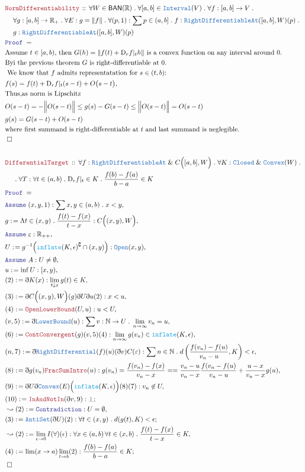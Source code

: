 \documentclass[12pt]{scrartcl}
\newcommand{\TYPE}[1]{\textcolor{NavyBlue}{\mathtt{#1}}}
\newcommand{\FUNC}[1]{\textcolor{Cerulean}{\mathtt{#1}}}
\newcommand{\LOGIC}[1]{\textcolor{Blue}{\mathtt{#1}}}
\newcommand{\THM}[1]{\textcolor{Maroon}{\mathtt{#1}}}
\renewcommand{\.}{\; . \;}
\newcommand{\de}{: \kern 0.1pc =}
\newcommand{\Theorem}[2]{& \THM{#1} \, :: \, #2 \\ & \Proof = \\ }
\newcommand{\NewLine}{\\ & \kern 1pc}
\newcommand{\Page}[1]{\begin{align*} #1 \end{align*}   }
\newcommand{ \bd }{ \ByDef }
\renewcommand{\And}{\; \& \;}
\newcommand{\Reals}{\mathbb{R} }
\newcommand{\Nat}{\mathbb{N} }
\renewcommand{\c}{\complement}
\newcommand{\Say}[3]{& #1 \de #2 : #3, \\}
\newcommand{\Conclude}[3]{& #1 \de #2 : #3; \\}
\newcommand{\Derive}[3]{& \leadsto #1 \de #2 : #3, \\}
\newcommand{\A}{\LOGIC{Assume} \;}
\newcommand{\Assume}[2]{& \A #1 : #2, \\}
\newcommand{\QED}{\; \square}
\newcommand{\EndProof}{& \QED \\}
\newcommand{\ByDef}{\eth}
\newcommand{\Proof}{\LOGIC{Proof} \; }
\newcommand{\BAN}{\mathsf{BAN}} %
\newcommand{\D}{\mathrm{D}}
\begin{document}
\Page{
	\Theorem{NormDifferentiability}{
		\forall W \in \BAN(\Reals) \. \forall [a,b] \in \TYPE{Interval}(V)  \.
		\forall f : [a,b] \to V \. \NewLine
		\forall g : [a,b] \to \Reals_{+} \. 
		\forall E : g = \| f \|  \.
		\forall (p,1) : \sum p \in  (a,b] \. f : \TYPE{RightDifferentiableAt}([a,b],W)(p) \.
		\NewLine
		g : \TYPE{RightDifferentiableAt}([a,b],W)(p)
	}
	& \textrm{Assume $t \in  [a,b)$, then $G(h) = \| f(t) + \D_r f |_t h \|$ is a convex function on any interval around $0$.} \\
	& \textrm{Byi the previous theorem $G$ is right-differentiable at $0$.  } \\
        & \textrm{ We know that $f$ admits representatation for $s \in (t,b)$:}\\
	& f(s) = f(t) + \D_r f |_t(s - t) + O\big( s -t \big), \\
	& \textrm{Thus,as norm is Lipschitz} \\
	&  O(s - t)  = - \Big\| O(s-t) \Big\| \le  g(s) - G(s - t)  \le \Big\| O(s - t) \Big\| = O(s - t)  \\
	&    g(s)  = G(s - t) + O(s - t)  \\
	& \textrm{where first summand is right-differentiable at $t$ and last summand is neglegible.}   \\
	\EndProof
	\\
	\Theorem{DifferentialTarget}{ \forall f : \TYPE{RightDifferentiableAt} \And C  \Big([a,b],W \Big) \.
	       \forall K : \TYPE{Closed} \And \TYPE{Convex}(W) \. 
	       \NewLine \.
	       \forall T : \forall t \in (a,b) \. \D_r f |_t \in K \.
	       \frac{ f(b) - f(a) }{b - a} \in K
	}
	\Assume{(x,y,1)}
	{
	  \sum x,y \in  (a,b) \.  x < y	
	}
	\Say{g}{\Lambda t \in (x,y) \. \frac{f(t) - f(x)}{t - x}}{C \Big( (x,y),W \Big)}
	\Assume{\varepsilon}{\Reals_{++}} 
	\Say{U}{ g^{-1} \Big(  \FUNC{inflate}( K, \epsilon   )^\c \cap (x,y)  \Big) }{\TYPE{Open}(x,y)}
	\Assume{A}{U \neq \emptyset}
	\Say{u}{ \inf U }{ [x,y) }
	\Say{(2)}{ \bd K(x)}{ \lim_{t \downarrow x} g(t) \in K }
	\Say{(3)}{\bd C\Big((x,y),W\Big )(g) \bd U \bd u(2) }{ x < u }
	\Say{(4)}{ \THM{OpenLowerBound}(U,u) }{u < U}
	\Say{(v,5)}{\bd \TYPE{LowerBound}(u)}{\sum v : \Nat \to U \. \lim_{n \to \infty} v_n = u}
	\Say{(6)}{\THM{ContConvergent}(g)(v,5)(4)}{\lim_{ n \to \infty} g(v_n) \in \FUNC{inflate}(K,\epsilon)}
	\Say{(n,7)}{ \bd \TYPE{RightDifferential}(f)(u)(\bd v)C(\varepsilon)}{ \sum n \in \Nat \. d\left(\frac{f(v_n) - f(u)}{v_n - u},K \right) < \epsilon    }
	\Say{(8)}{\bd g(v_n) \THM{FracSumIntro}(u)}{   g(v_n) =   \frac{f(v_n) - f(x)}{v_n - x}  = 
		=  \frac{v_n - u}{ v_n - x}\frac{f(v_n - f(u)}{v_n - u} + \frac{u - x}{v_n - x}g(u)
	}
	\Say{(9)}{\bd U \bd \TYPE{Convex}(E)\Big( \FUNC{inflate}(K, \epsilon)  \Big)(8)(7)}{v_n \not \in U}
	\Conclude{(10)}{\THM{InAndNotIn}(\bd v,9)}{\bot }
	\Derive{(2)}{\LOGIC{Contradiction}}{ U = \emptyset }
	\Conclude{(3)}{ \TYPE{AntiSet}(\bd U ) (2) }{ \forall t \in (x,y) \. d(g(t),K) < \epsilon }
	\Derive{ (2)  }{\lim_{\epsilon \to 0} I(\forall)(\epsilon)}{ \forall x \in (a,b) \, \forall t \in (x,b) \. \frac{f(t) - f(x)}{t - x} \in K }
	\Conclude{(4)}{ \lim( x \to a) \lim_{t \to b} (2) }{ \frac{f(b) - f(a) }{b - a} \in K }
	\EndProof
}
\end{document}
